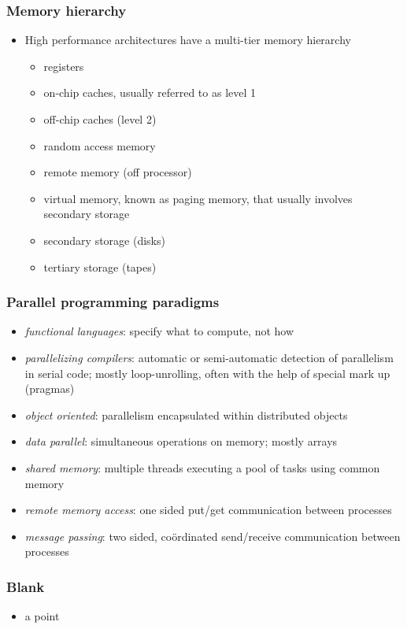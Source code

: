 \begin{frame}[fragile]
%
  \frametitle{Memory hierarchy}
%
  \begin{itemize}
  \item High performance architectures have a multi-tier memory hierarchy
%
    \begin{itemize}
%
    \item registers
    \item on-chip caches, usually referred to as level 1
    \item off-chip caches (level 2)
    \item random access memory
    \item remote memory (off processor)
    \item virtual memory, known as paging memory, that usually involves secondary storage
    \item secondary storage (disks)
    \item tertiary storage (tapes)
%
    \end{itemize}
%
  \end{itemize}
%
\end{frame}

\begin{frame}[fragile]
%
  \frametitle{Parallel programming paradigms}
%
  \begin{itemize}
%
  \item {\em functional languages}: specify what to compute, not how
  \item {\em parallelizing compilers}: automatic or semi-automatic detection of parallelism in
    serial code; mostly loop-unrolling, often with the help of special mark up (pragmas)
  \item {\em object oriented}: parallelism encapsulated within distributed objects

  \item {\em data parallel}: simultaneous operations on memory; mostly arrays
  \item {\em shared memory}: multiple threads executing a pool of tasks using common memory
  \item {\em remote memory access}: one sided put/get communication between processes
  \item {\em message passing}: two sided, co\"ordinated send/receive communication between
    processes
%
  \end{itemize}
%
\end{frame}

\begin{frame}[fragile]
%
  \frametitle{Blank}
%
  \begin{itemize}
%
  \item a point
%
  \end{itemize}
%
\end{frame}

